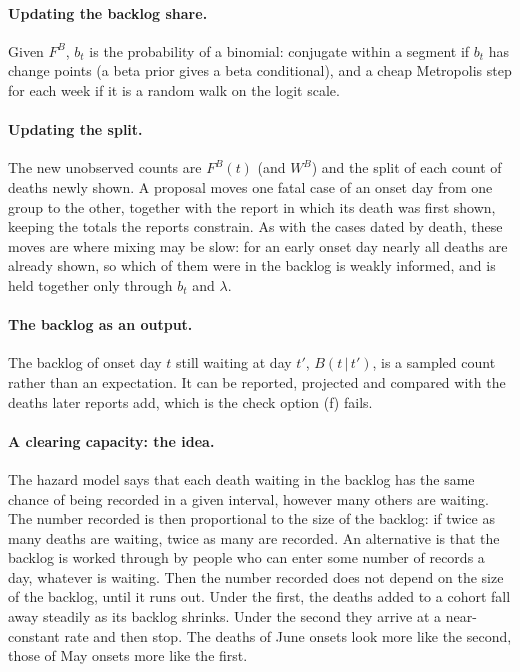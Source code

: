 \documentclass[11pt,a4paper]{article}
\newcommand{\given}{\,|\,}
\begin{document}
\paragraph{Updating the backlog share.} Given $F^{B}$, $b_t$ is the
probability of a binomial: conjugate within a segment if $b_t$ has change
points (a beta prior gives a beta conditional), and a cheap Metropolis step
for each week if it is a random walk on the logit scale.

\paragraph{Updating the split.} The new unobserved counts are $F^{B}(t)$ (and
$W^{B}$) and the split of each count of deaths newly shown. A proposal moves
one fatal case of an onset day from one group to the other, together with
the report in which its death was first shown, keeping the totals the
reports constrain. As with the cases dated by death, these moves are where
mixing may be slow: for an early onset day nearly all deaths are already
shown, so which of them were in the backlog is weakly informed, and is held
together only through $b_t$ and $\lambda$.

\paragraph{The backlog as an output.} The backlog of onset day $t$ still
waiting at day $t'$, $B(t\given t')$, is a sampled count rather than an
expectation. It can be reported, projected and compared with the deaths
later reports add, which is the check option (f) fails.

\paragraph{A clearing capacity: the idea.} The hazard model says that each
death waiting in the backlog has the same chance of being recorded in a
given interval, however many others are waiting. The number recorded is
then proportional to the size of the backlog: if twice as many deaths are
waiting, twice as many are recorded. An alternative is that the backlog is
worked through by people who can enter some number of records a day,
whatever is waiting. Then the number recorded does not depend on the size of
the backlog, until it runs out. Under the first, the deaths added to a
cohort fall away steadily as its backlog shrinks. Under the second they
arrive at a near-constant rate and then stop. The deaths of June onsets look
more like the second, those of May onsets more like the first.
\end{document}
